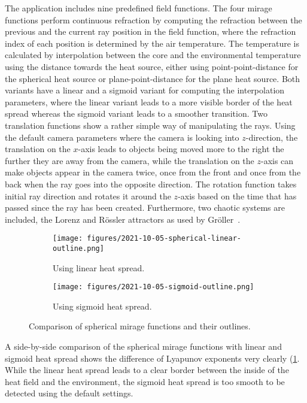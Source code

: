 The application includes nine predefined field functions.
The four mirage functions perform continuous refraction by computing the refraction between the previous and the current ray position in the field function, where the refraction index of each position is determined by the air temperature.
The temperature is calculated by interpolation between the core and the environmental temperature using the distance towards the heat source, either using point-point-distance for the spherical heat source or plane-point-distance for the plane heat source.
Both variants have a linear and a sigmoid variant for computing the interpolation parameters, where the linear variant leads to a more visible border of the heat spread whereas the sigmoid variant leads to a smoother transition.
Two translation functions show a rather simple way of manipulating the rays.
Using the default camera parameters where the camera is looking into $z$-direction, the translation on the $x$-axis leads to objects being moved more to the right the further they are away from the camera, while the translation on the $z$-axis can make objects appear in the camera twice, once from the front and once from the back when the ray goes into the opposite direction.
The rotation function takes initial ray direction and rotates it around the $z$-axis based on the time that has passed since the ray has been created.
Furthermore, two chaotic systems are included, the Lorenz and Rössler attractors as used by Gröller~\cite{grollerNonlinearRayTracing1995}.
\begin{figure}[!t]
\centering
\begin{subfigure}{0.48\linewidth}
    \texttt{[image: figures/2021-10-05-spherical-linear-outline.png]}
    \caption{Using linear heat spread.}
\end{subfigure}
\begin{subfigure}{0.48\linewidth}
    \texttt{[image: figures/2021-10-05-sigmoid-outline.png]}
    \caption{Using sigmoid heat spread.}
\end{subfigure}
  \caption{Comparison of spherical mirage functions and their outlines.}
  \label{fig:mirage-heat-spread-comparison}
\end{figure}
A side-by-side comparison of the spherical mirage functions with linear and sigmoid heat spread shows the difference of Lyapunov exponents very clearly (\cref{fig:mirage-heat-spread-comparison}.
While the linear heat spread leads to a clear border between the inside of the heat field and the environment, the sigmoid heat spread is too smooth to be detected using the default settings.
